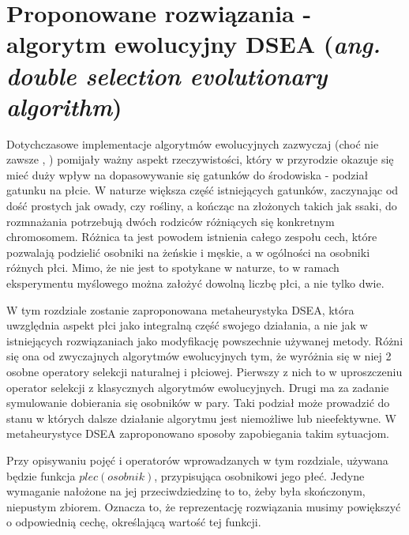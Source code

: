 \documentclass[./FM_mgr.tex]{subfiles}
\begin{document}
\chapter{Proponowane rozwiązania - algorytm ewolucyjny DSEA (\emph{ang. double selection evolutionary algorithm})} \label{chapter:proposed}

Dotychczasowe implementacje algorytmów ewolucyjnych zazwyczaj (choć nie zawsze \cite{GGA}, \cite{SexualGA}) pomijały ważny aspekt rzeczywistości, który w przyrodzie okazuje się mieć duży wpływ na dopasowywanie się gatunków do środowiska - podział gatunku na płcie. 
W naturze większa część istniejących gatunków, zaczynając od dość prostych jak owady, czy rośliny, a kończąc na złożonych takich jak ssaki, do rozmnażania potrzebują dwóch rodziców różniących się konkretnym chromosomem. 
Różnica ta jest powodem istnienia całego zespołu cech, które pozwalają podzielić osobniki na żeńskie i męskie, a w ogólności na osobniki różnych płci. 
Mimo, że nie jest to spotykane w naturze, to w ramach eksperymentu myślowego można założyć dowolną liczbę płci, a nie tylko dwie.

W tym rozdziale zostanie zaproponowana metaheurystyka DSEA, która uwzględnia aspekt płci jako integralną część swojego działania, a nie jak w istniejących rozwiązaniach jako modyfikację powszechnie używanej metody.
Różni się ona od zwyczajnych algorytmów ewolucyjnych tym, że wyróżnia się w niej 2 osobne operatory selekcji naturalnej i płciowej.
Pierwszy z nich to w uproszczeniu operator selekcji z klasycznych algorytmów ewolucyjnych.
Drugi ma za zadanie symulowanie dobierania się osobników w pary.
Taki podział może prowadzić do stanu w których dalsze działanie algorytmu jest niemożliwe lub nieefektywne.
W metaheurystyce DSEA zaproponowano sposoby zapobiegania takim sytuacjom.

Przy opisywaniu pojęć i operatorów wprowadzanych w tym rozdziale, używana będzie funkcja $plec(osobnik)$, przypisująca osobnikowi jego płeć.
Jedyne wymaganie nałożone na jej przeciwdziedzinę to to, żeby była skończonym, niepustym zbiorem.
Oznacza to, że reprezentację rozwiązania musimy powiększyć o odpowiednią cechę, określającą wartość tej funkcji.
\end{document}
